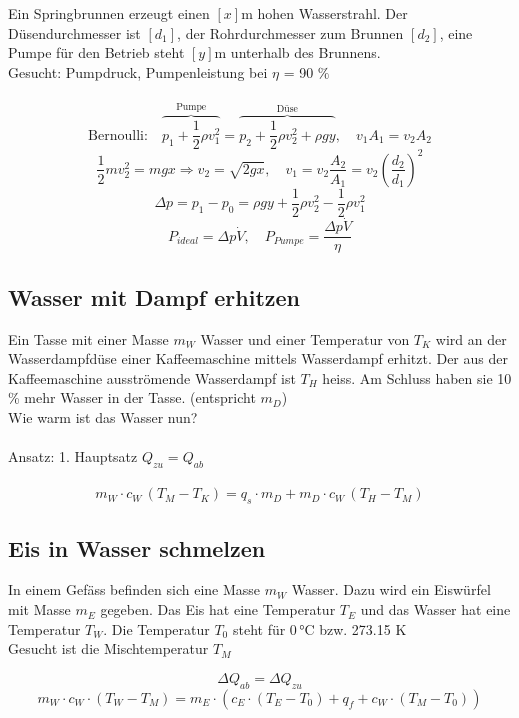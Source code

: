 Ein Springbrunnen erzeugt einen $[x]$m hohen Wasserstrahl. Der Düsendurchmesser ist $[d_1]$, der Rohrdurchmesser zum Brunnen $[d_2]$, eine Pumpe für den Betrieb steht $[y]$m unterhalb des Brunnens. \\
Gesucht: Pumpdruck, Pumpenleistung bei $\eta$ = 90 $\%$\\
\\
$$\text{Bernoulli:} \quad  \overbrace{ p_1 + \frac{1}{2}\rho v_1^2}^{\text{Pumpe}} = \overbrace{p_2 + \frac{1}{2}\rho v_2^2 + \rho g y}^{\text{Düse}}, \quad v_1A_1 = v_2A_2 $$
$$ \frac{1}{2}mv^2_2 = mgx \Rightarrow v_2 = \sqrt{2gx}, \quad v_1 = v_2\frac{A_2}{A_1} = v_2\left(\frac{d_2}{d_1}\right)^2 $$
$$ \Delta p = p_1 - p_0 = \rho g y + \frac{1}{2}\rho v_2^2 - \frac{1}{2}\rho v_1^2 $$
$$ P_{ideal} = \Delta p \dot{V}, \quad P_{Pumpe} = \frac{\Delta p \dot{V}}{\eta} $$


\subsection{Wasser mit Dampf erhitzen}

Ein Tasse mit einer Masse $m_W$ Wasser und einer Temperatur von $T_K$ wird an
der Wasserdampfdüse einer Kaffeemaschine mittels Wasserdampf erhitzt. Der aus der
Kaffeemaschine ausströmende Wasserdampf ist $T_H$ heiss. Am Schluss haben sie 10 \%
mehr Wasser in der Tasse. (entspricht $m_D$)\\
Wie warm ist das Wasser nun? \\
\\
Ansatz: 1. Hauptsatz \quad $Q_{zu} = Q_{ab}$ \\
\\
$$ m_W \cdot c_W \, (T_M - T_K) = q_s \cdot m_D + m_D \cdot c_W \, (T_H - T_M) $$



\subsection{Eis in Wasser schmelzen}

In einem Gefäss befinden sich eine Masse $m_W$ Wasser. Dazu wird ein Eiswürfel mit Masse $m_E$ gegeben. Das Eis hat eine Temperatur $T_E$ und das Wasser hat eine Temperatur $T_W$. Die Temperatur $T_0$ steht für $0 \, \text{°C}$ bzw. 273.15 K \\
Gesucht ist die Mischtemperatur $T_M$ 

$$ \Delta Q_{ab} = \Delta Q_{zu}$$
$$ m_W \cdot c_W \cdot (T_W - T_M) = m_E \cdot \left( c_E \cdot (T_E - T_0) + q_f  +  c_W \cdot (T_M - T_0) \right) $$

